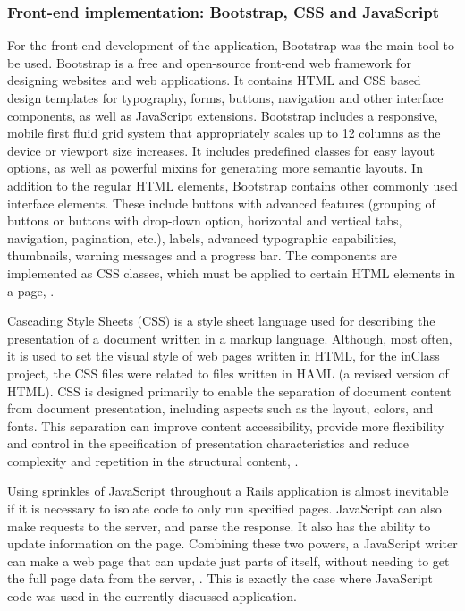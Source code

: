 \subsubsection{Front-end implementation: Bootstrap, CSS and JavaScript }
For the front-end development of the application, Bootstrap was the main tool to be used. Bootstrap is a free and open-source front-end web framework for designing websites and web applications. It contains HTML and CSS based design templates for typography, forms, buttons, navigation and other interface components, as well as JavaScript extensions. Bootstrap includes a responsive, mobile first fluid grid system that appropriately scales up to 12 columns as the device or viewport size increases. It includes predefined classes for easy layout options, as well as powerful mixins for generating more semantic layouts. In addition to the regular HTML elements, Bootstrap contains other commonly used interface elements. These include buttons with advanced features (grouping of buttons or buttons with drop-down option, horizontal and vertical tabs, navigation, pagination, etc.), labels, advanced typographic capabilities, thumbnails, warning messages and a progress bar. The components are implemented as CSS classes, which must be applied to certain HTML elements in a page, \cite{bootstrap}.

Cascading Style Sheets (CSS) is a style sheet language used for describing the presentation of a document written in a markup language. Although, most often, it is used to set the visual style of web pages  written in HTML, for the inClass project, the CSS files were related to files written in HAML (a revised version of HTML). CSS is designed primarily to enable the separation of document content from document presentation, including aspects such as the layout, colors, and fonts. This separation can improve content accessibility, provide more flexibility and control in the specification of presentation characteristics and reduce complexity and repetition in the structural content, \cite{css}.

Using sprinkles of JavaScript throughout a Rails application is almost inevitable if it is necessary to isolate code to only run specified pages. JavaScript can also make requests to the server, and parse the response. It also has the ability to update information on the page. Combining these two powers, a JavaScript writer can make a web page that can update just parts of itself, without needing to get the full page data from the server, \cite{js}. This is exactly the case where JavaScript code was used in the currently discussed application. 